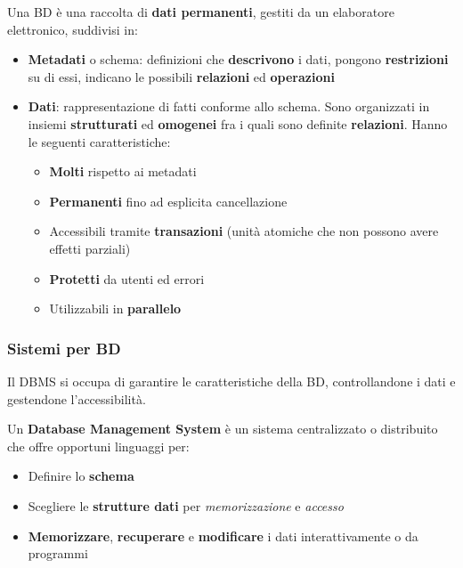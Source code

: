 \begin{definition}
	Una BD è una raccolta di \textbf{dati permanenti}, gestiti da un	elaboratore elettronico, suddivisi in:
	\begin{itemize}
		\item \textbf{Metadati} o schema: definizioni che \textbf{descrivono} i dati, pongono \textbf{restrizioni} su di essi, indicano le possibili \textbf{relazioni} ed \textbf{operazioni}
		\item \textbf{Dati}: rappresentazione di fatti conforme allo schema. Sono organizzati in insiemi \textbf{strutturati} ed \textbf{omogenei} fra i quali sono definite \textbf{relazioni}. Hanno le seguenti caratteristiche:
		\begin{itemize}
			\item \textbf{Molti} rispetto ai metadati
			\item \textbf{Permanenti} fino ad esplicita cancellazione
			\item Accessibili tramite \textbf{transazioni} (unità atomiche che non possono avere effetti parziali)
			\item \textbf{Protetti} da utenti ed errori
			\item Utilizzabili in \textbf{parallelo}
		\end{itemize}
	\end{itemize}
\end{definition}

\subsubsection{Sistemi per BD}
Il DBMS si occupa di garantire le caratteristiche della BD, controllandone i dati e gestendone l'accessibilità.

\begin{definition}[DBMS]
	Un \textbf{Database Management System} è un sistema centralizzato o	distribuito che offre opportuni linguaggi per:
	\begin{itemize}
		\item Definire lo \textbf{schema}
		\item Scegliere le \textbf{strutture dati} per \textit{memorizzazione} e \textit{accesso}
		\item \textbf{Memorizzare}, \textbf{recuperare} e \textbf{modificare} i dati interattivamente o da programmi
	\end{itemize}
\end{definition}

